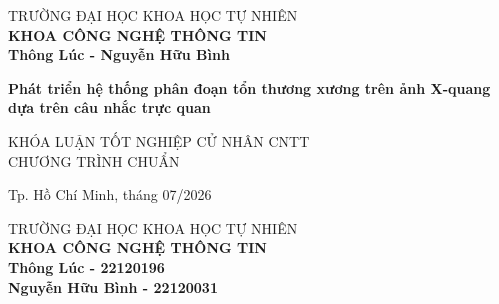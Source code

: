 \begin{titlepage}

\begin{center}
TRƯỜNG ĐẠI HỌC KHOA HỌC TỰ NHIÊN\\
\textbf{KHOA CÔNG NGHỆ THÔNG TIN}\\[2cm]


{ \Large \bfseries Thông Lúc - Nguyễn Hữu Bình\\[2cm] } 


{ \Large \bfseries Phát triển hệ thống phân đoạn tổn thương xương trên ảnh X-quang dựa trên câu nhắc trực quan \\[3cm]}


\large KHÓA LUẬN TỐT NGHIỆP CỬ NHÂN CNTT\\ CHƯƠNG TRÌNH CHUẨN



\vfill
Tp. Hồ Chí Minh, tháng 07/2026

\end{center}

\pagebreak
\thispagestyle{empty}



\begin{center}

TRƯỜNG ĐẠI HỌC KHOA HỌC TỰ NHIÊN\\
\textbf{KHOA CÔNG NGHỆ THÔNG TIN}\\[2cm]


{\large \bfseries Thông Lúc - 22120196\\ Nguyễn Hữu Bình - 22120031}\\[2cm]




\end{center}
\end{titlepage}
